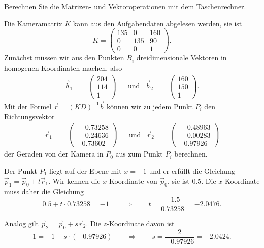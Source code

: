 \begin{hinweis}
Berechnen Sie die Matrizen- und Vektoroperationen mit dem Taschenrechner.
\end{hinweis}

\begin{loesung}
\begin{teilaufgaben}
\item
Die Kameramatrix $K$ kann aus den Aufgabendaten abgelesen werden, sie ist
\[
K
=
\begin{pmatrix}
135&  0&160\\
  0&135& 90\\
  0&  0&  1
\end{pmatrix}.
\]
Zunächst müssen wir aus den Punkten $B_i$ dreidimensionale Vektoren
in homogenen Koordinaten machen, also
\[
\begin{aligned}
\vec b_1 &= \begin{pmatrix}204\\114\\1\end{pmatrix}
&&\text{und}&
\vec b_2 &= \begin{pmatrix}160\\150\\1\end{pmatrix}.
\end{aligned}
\]
Mit der Formel $\vec{r} = (KD)^{-1} \vec b$ können wir zu jedem Punkt $P_i$
den Richtungsvektor
\[
\begin{aligned}
\vec r_1
&=
\begin{pmatrix}
\phantom{-}0.73258 \\
\phantom{-}0.24636 \\
-0.73602
\end{pmatrix}
&&\text{und}&
\vec r_2 &= \begin{pmatrix} 
\phantom{-}0.48963\\
\phantom{-}0.00283\\
         - 0.97926
\end{pmatrix}
\end{aligned}
\]
der Geraden von der Kamera in $P_0$ aus zum Punkt $P_i$ berechnen.

Der Punkt $P_1$ liegt auf der Ebene mit $x=-1$ und er erfüllt die
Gleichung $\vec{p}_1 = \vec{p}_0 + t\vec{r}_1$.
Wir kennen die $x$-Koordinate von $\vec{p}_0$, sie ist $0.5$.
Die $x$-Koordinate muss daher die Gleichung 
\[
0.5 + t\cdot 0.73258 = -1
\qquad\Rightarrow\qquad
t = \frac{-1.5}{0.73258}=-2.0476.
\]

Analog gilt $\vec{p}_2=\vec{p}_0+s\vec{r}_2$.
Die $z$-Koordinate davon ist
\[
1=-1+s\cdot (-0.97926)
\qquad\Rightarrow\qquad
s = \frac2{-0.97926}=-2.0424.
\]


\end{teilaufgaben}
\end{loesung}
